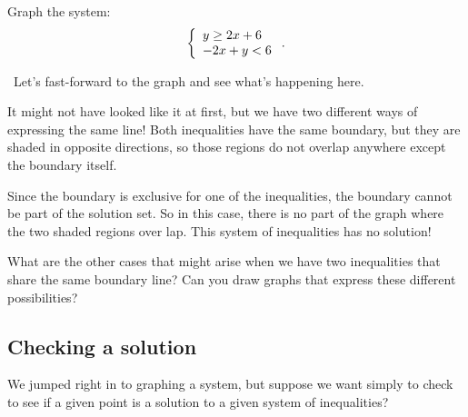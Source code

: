 \begin{boxedex}
Graph the system:\[\left\{\begin{array}{l}y\geq2x+6\\-2x+y<6\end{array}\right..\]

\exsoln\ Let's fast-forward to the graph and see what's happening here.

\begin{center}
\end{center}

It might not have looked like it at first, but we have two different ways of expressing the same line! Both inequalities have the same boundary, but they are shaded in opposite directions, so those regions do not overlap anywhere except the boundary itself.

Since the boundary is exclusive for one of the inequalities, the boundary cannot be part of the solution set. So in this case, there is no part of the graph where the two shaded regions over lap. This system of inequalities has no solution!
\end{boxedex}

What are the other cases that might arise when we have two inequalities that share the same boundary line? Can you draw graphs that express these different possibilities?

\subsection{Checking a solution}

We jumped right in to graphing a system, but suppose we want simply to check to see if a given point is a solution to a given system of inequalities?

